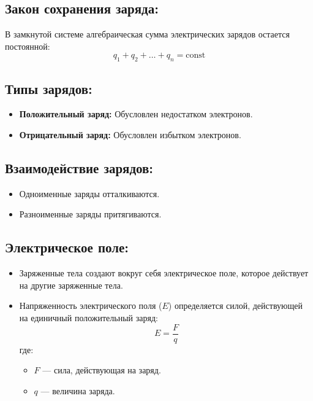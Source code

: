 \documentclass[a4paper,12pt]{article}
\begin{document}
\vspace{-9pt}
\subsection*{Закон сохранения заряда:}
\vspace{-3pt}
В замкнутой системе алгебраическая сумма электрических зарядов остается постоянной:
\vspace{-0.05em}
$$ q_1 + q_2 + \dots + q_n = \text{const} $$

\vspace{-9pt}
\subsection*{Типы зарядов:}
\vspace{-3pt}
\begin{itemize}
    \item \textbf{Положительный заряд:} Обусловлен недостатком электронов.
    \item \textbf{Отрицательный заряд:} Обусловлен избытком электронов.
\end{itemize}

\vspace{-9pt}
\subsection*{Взаимодействие зарядов:}
\vspace{-3pt}
\begin{itemize}
    \item Одноименные заряды отталкиваются.
    \item Разноименные заряды притягиваются.
\end{itemize}

\vspace{-9pt}
\subsection*{Электрическое поле:}
\vspace{-3pt}
\begin{itemize}
    \item Заряженные тела создают вокруг себя электрическое поле, которое действует на другие заряженные тела.
    \item Напряженность электрического поля ($E$) определяется силой, действующей на единичный положительный заряд:
    \vspace{-0.05em}
    $$ E = \frac{F}{q} $$
    где:
    \begin{itemize}
        \item $F$ — сила, действующая на заряд.
        \item $q$ — величина заряда.
    \end{itemize}
\end{itemize}
\end{document}
